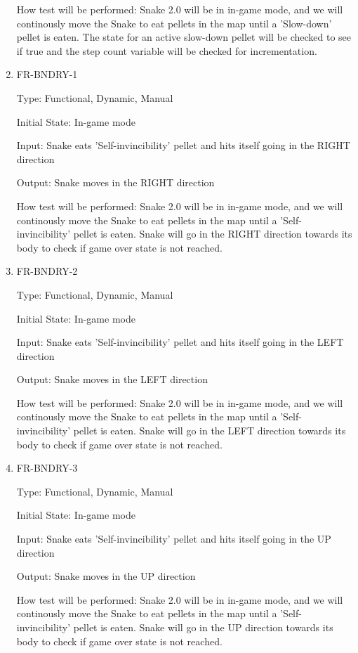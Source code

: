 \documentclass[12pt, titlepage]{article}
\begin{document}
\begin{enumerate}
How test will be performed: Snake 2.0 will be in in-game mode, and we will continously move the Snake to eat pellets in the map until a 'Slow-down'  pellet is eaten. The state for an active slow-down pellet will be checked to see if true and the step count variable will be checked for incrementation. 

\item{FR-BNDRY-1}
\label{fr:bndry-1}

Type: Functional, Dynamic, Manual

Initial State: In-game mode

Input: Snake eats 'Self-invincibility' pellet and hits itself going in the RIGHT direction

Output: Snake moves in the RIGHT direction

How test will be performed: Snake 2.0 will be in in-game mode, and we will continously move the Snake to eat pellets in the map until a 'Self-invincibility' pellet is eaten. Snake will go in the RIGHT direction towards its body to check if game over state is not reached.

\item{FR-BNDRY-2}
\label{fr:bndry-2}

Type: Functional, Dynamic, Manual

Initial State: In-game mode

Input: Snake eats 'Self-invincibility' pellet and hits itself going in the LEFT direction

Output: Snake moves in the LEFT direction

How test will be performed: Snake 2.0 will be in in-game mode, and we will continously move the Snake to eat pellets in the map until a 'Self-invincibility' pellet is eaten. Snake will go in the LEFT direction towards its body to check if game over state is not reached.

\item{FR-BNDRY-3}
\label{fr:bndry-3}

Type: Functional, Dynamic, Manual

Initial State: In-game mode

Input: Snake eats 'Self-invincibility' pellet and hits itself going in the UP direction

Output: Snake moves in the UP direction

How test will be performed: Snake 2.0 will be in in-game mode, and we will continously move the Snake to eat pellets in the map until a 'Self-invincibility' pellet is eaten. Snake will go in the UP direction towards its body to check if game over state is not reached.


\end{enumerate}
\end{document}

